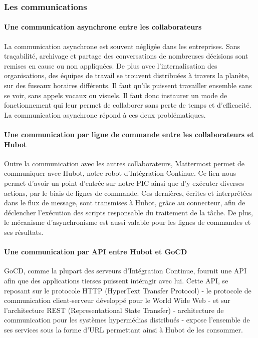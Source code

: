         \subsubsection{Les communications}
          \paragraph{Une communication asynchrone entre les collaborateurs}
          La communication asynchrone est souvent négligée dans les entreprises. Sans traçabilité, archivage et partage des conversations de nombreuses décisions sont remises en cause ou non appliquées. De plus avec l'internalisation des organisations, des équipes de travail se trouvent distribuées à travers la planète, sur des fuseaux horaires différents. Il faut qu'ils puissent travailler ensemble sans se voir, sans appels vocaux ou visuels. Il faut donc instaurer un mode de fonctionnement qui leur permet de collaborer sans perte de temps et d'efficacité. La communication asynchrone répond à ces deux problématiques.

          \paragraph{Une communication par ligne de commande entre les collaborateurs et Hubot}
          Outre la communication avec les autres collaborateurs, Mattermost permet de communiquer avec Hubot, notre robot d'Intégration Continue. Ce lien nous permet d'avoir un point d'entrée sur notre PIC ainsi que d'y exécuter diverses actions, par le biais de lignes de commande. Ces dernières, écrites et interprétées dans le flux de message, sont transmises à Hubot, grâce au connecteur, afin de déclencher l'exécution des scripts responsable du traitement de la tâche. De plus, le mécanisme d'asynchronisme est aussi valable pour les lignes de commandes et ses résultats.

          \paragraph{Une communication par API entre Hubot et GoCD}
          GoCD, comme la plupart des serveurs d'Intégration Continue, fournit une API afin que des applications tierses puissent intéragir avec lui. Cette API, se reposant sur le protocole \gls{HTTP} (HyperText Transfer Protocol) - le protocole de communication client-serveur développé pour le World Wide Web - et sur l'architecture \gls{REST} (Representational State Transfer) - architecture de communication pour les systèmes hypermédias distribués - expose l'ensemble de ses services sous la forme d'URL permettant ainsi à Hubot de les consommer.


